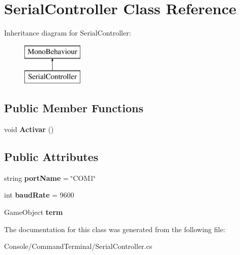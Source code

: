 \hypertarget{class_serial_controller}{}\section{Serial\+Controller Class Reference}
\label{class_serial_controller}
Inheritance diagram for Serial\+Controller\+:\begin{figure}[H]
\begin{center}
\leavevmode
\includegraphics[height=2.000000cm]{class_serial_controller}
\end{center}
\end{figure}
\subsection*{Public Member Functions}
\begin{DoxyCompactItemize}
\item 
\mbox{\label{class_serial_controller_ab402fcba3ff214f97cd595a2d089ebc9}} 
void {\bfseries Activar} ()
\end{DoxyCompactItemize}
\subsection*{Public Attributes}
\begin{DoxyCompactItemize}
\item 
\mbox{\label{class_serial_controller_afd06697d77f9bf30567820f957c5dca6}} 
string {\bfseries port\+Name} = \char`\"{}C\+O\+M1\char`\"{}
\item 
\mbox{\label{class_serial_controller_a96535d826c1065405c906c8a15f332bc}} 
int {\bfseries baud\+Rate} = 9600
\item 
\mbox{\label{class_serial_controller_a2e6998ce4c6694fd149c7617a6568ecf}} 
Game\+Object {\bfseries term}
\end{DoxyCompactItemize}


The documentation for this class was generated from the following file\+:\begin{DoxyCompactItemize}
\item 
Console/\+Command\+Terminal/Serial\+Controller.\+cs\end{DoxyCompactItemize}
